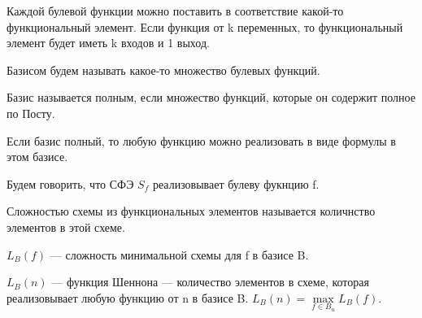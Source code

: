 Каждой булевой функции можно поставить в соответствие какой-то функциональный
элемент. Если функция от k переменных, то функциональный элемент будет иметь k
входов и 1 выход.

Базисом будем называть какое-то множество булевых функций.
\begin{definition}
	Базис называется полным, если множество функций, которые он содержит
	полное по Посту.
\end{definition}

Если базис полный, то любую функцию можно реализовать в виде формулы в этом
базисе. 

Будем говорить, что СФЭ $S_f$ реализовывает булеву фукнцию f.

\begin{definition}
	Сложностью схемы из функциональных элементов называется количнство
	элементов в этой схеме.
\end{definition}

$L_B(f)$ --- сложность минимальной схемы для f в базисе B.

$L_B(n)$ --- функция Шеннона --- количество элементов в схеме, которая
реализовывает любую функцию от n в базисе B.  $L_B(n) = \max\limits_{f\in
B_n}L_B(f) $.

